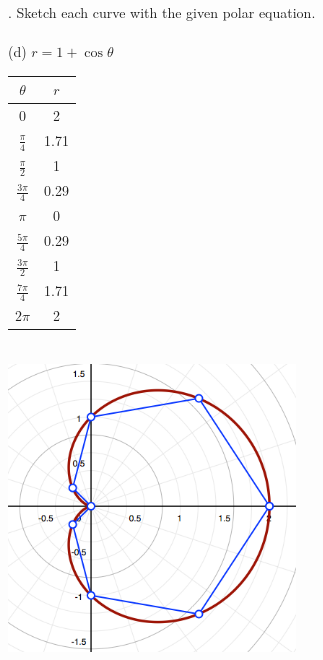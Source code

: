 \documentclass[11pt]{exam}
\begin{document}
. Sketch each curve with the given polar equation. \\
\\
\indent (d) $r=1+ \cos \theta$\\
\newline
\newline
\def\arraystretch{1.5}
\begin{tabular}{ c|c }
  $\theta$ & $r$ \\
  \hline
  0                & 2    \\
  $\frac{\pi}{4}$  & 1.71 \\
  $\frac{\pi}{2}$  & 1    \\
  $\frac{3\pi}{4}$ & 0.29 \\
  $\pi$            & 0    \\
  $\frac{5\pi}{4}$ & 0.29 \\
  $\frac{3\pi}{2}$ & 1    \\
  $\frac{7\pi}{4}$ & 1.71 \\
  $2\pi$           & 2    \\
\end{tabular}\\
\includegraphics[width=3in]{g10d.png}
\end{document}
